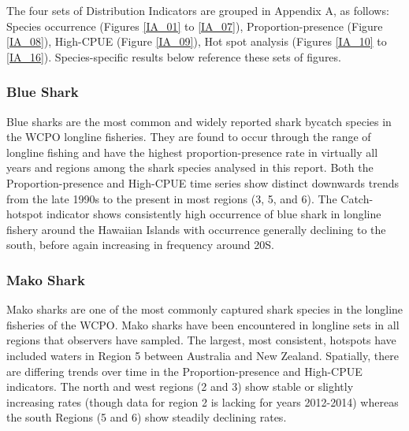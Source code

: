 \documentclass[12pt]{SCreport}
\begin{document}
      The four sets of Distribution Indicators are grouped in Appendix A, as follows: Species occurrence (Figures \ref{IA_01} to \ref{IA_07}), Proportion-presence (Figure \ref{IA_08}), High-CPUE (Figure \ref{IA_09}), Hot spot analysis (Figures \ref{IA_10} to \ref{IA_16}).  Species-specific results below reference these sets of figures.
      
        \subsubsection{Blue Shark}
Blue sharks are the most common and widely reported shark bycatch species in the WCPO longline fisheries.  They are found to occur through the range of longline fishing and have the highest proportion-presence rate in virtually all years and regions among the shark species analysed in this report.  Both the Proportion-presence and High-CPUE time series show distinct downwards trends from the late 1990s to the present in most regions (3, 5, and 6).  The Catch-hotspot indicator shows consistently high occurrence of blue shark in longline fishery around the Hawaiian Islands with occurrence generally declining to the south, before again increasing in frequency around 20\degree S.





\subsubsection{Mako Shark}
Mako sharks are one of the most commonly captured shark species in the longline fisheries of the WCPO.  Mako sharks have been encountered in longline sets in all regions that observers have sampled.  The largest, most consistent, hotspots have included waters in Region 5 between Australia and New Zealand.  Spatially, there are differing trends over time in the Proportion-presence and High-CPUE indicators.  The north and west regions (2 and 3) show stable or slightly increasing rates (though data for region 2 is lacking for years 2012-2014) whereas the south Regions (5 and 6) show steadily declining rates.
\end{document}
